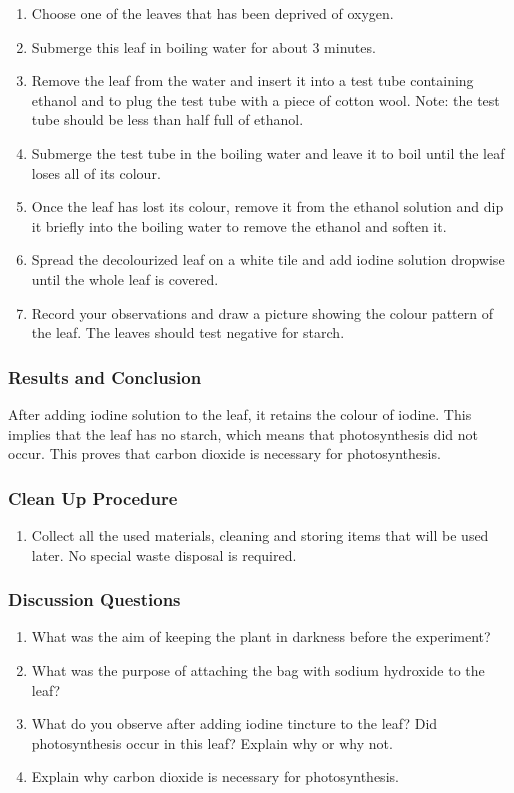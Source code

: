 \begin{enumerate}
\item{Choose one of the leaves that has been deprived of oxygen.}
\item{Submerge this leaf in boiling water for about 3 minutes.}
\item{Remove the leaf from the water and insert it into a test tube containing ethanol and to plug the test tube with a piece of cotton wool. Note: the test tube should be less than half full of ethanol.}
\item{Submerge the test tube in the boiling water and leave it to boil until the leaf loses all of its colour.}
\item{Once the leaf has lost its colour, remove it from the ethanol solution and dip it briefly into the boiling water to remove the ethanol and soften it.}
\item{Spread the decolourized leaf on a white tile and add iodine solution dropwise until the whole leaf is covered. }
\item{Record your observations and draw a picture showing the colour pattern of the leaf. The leaves should test negative for starch.}
\end{enumerate}

\subsubsection*{Results and Conclusion}
After adding iodine solution to the leaf, it retains the colour of iodine. This implies that the leaf has no starch, which means that photosynthesis did not occur. This proves that carbon dioxide is necessary for photosynthesis.

\subsubsection*{Clean Up Procedure}
\begin{enumerate}
\item{Collect all the used materials, cleaning and storing items that will be used later. No special waste disposal is required.}
\end{enumerate}

\subsubsection*{Discussion Questions}
\begin{enumerate}
\item{What was the aim of keeping the plant in darkness before the experiment?}
\item{What was the purpose of attaching the bag with sodium hydroxide to the leaf?}
\item{What do you observe after adding iodine tincture to the leaf? Did photosynthesis occur in this leaf? Explain why or why not.}
\item{Explain why carbon dioxide is necessary for photosynthesis.}
\end{enumerate}

